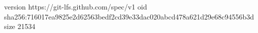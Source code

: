version https://git-lfs.github.com/spec/v1
oid sha256:716017ea9825e2d62563bedf2cd39e33dac020abcd478a621d29e68c94556b3d
size 21534
